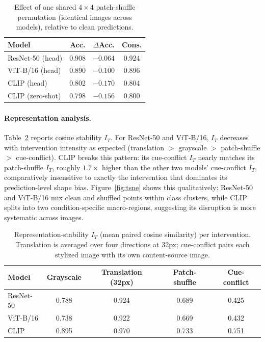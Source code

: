 \documentclass{article}
\begin{document}
\begin{table}[t]
  \caption{Effect of one shared $4{\times}4$ patch-shuffle permutation (identical images across models), relative to clean predictions.}
  \label{tab:t1-patchshuffle}
  \centering
  \footnotesize
  \begin{tabular}{lccc}
    \toprule
    Model & Acc. & $\Delta$Acc. & Cons. \\
    \midrule
    ResNet-50 (head) & 0.908 & $-0.064$ & 0.924 \\
    ViT-B/16 (head)  & 0.890 & $-0.100$ & 0.896 \\
    CLIP (head)      & 0.802 & $-0.170$ & 0.804 \\
    CLIP (zero-shot) & 0.798 & $-0.156$ & 0.800 \\
    \bottomrule
  \end{tabular}
\end{table}

\paragraph{Representation analysis.}
\label{sec:t1-representation}
Table~\ref{tab:t1-representation} reports cosine stability $I_T$. For ResNet-50 and ViT-B/16, $I_T$ decreases with intervention intensity as expected (translation $>$ grayscale $>$ patch-shuffle $>$ cue-conflict). CLIP breaks this pattern: its cue-conflict $I_T$ nearly matches its patch-shuffle $I_T$, roughly $1.7\times$ higher than the other two models' cue-conflict $I_T$, comparatively insensitive to exactly the intervention that dominates its prediction-level shape bias. Figure~\ref{fig:tsne} shows this qualitatively: ResNet-50 and ViT-B/16 mix clean and shuffled points within class clusters, while CLIP splits into two condition-specific macro-regions, suggesting its disruption is more systematic across images.

\begin{table}[t]
  \caption{Representation-stability $I_T$ (mean paired cosine similarity) per intervention. Translation is averaged over four directions at 32px; cue-conflict pairs each stylized image with its own content-source image.}
  \label{tab:t1-representation}
  \centering
  \footnotesize
  \begin{tabular}{lcccc}
    \toprule
    Model & Grayscale & Translation (32px) & Patch-shuffle & Cue-conflict \\
    \midrule
    ResNet-50 & 0.788 & 0.924 & 0.689 & 0.425 \\
    ViT-B/16  & 0.738 & 0.922 & 0.669 & 0.432 \\
    CLIP      & 0.895 & 0.970 & 0.733 & 0.751 \\
    \bottomrule
  \end{tabular}
\end{table}
\end{document}
